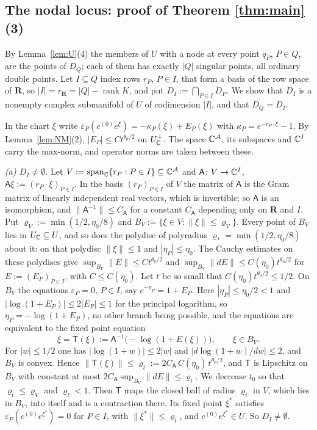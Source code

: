 \subsection{The nodal locus: proof of Theorem \texorpdfstring{\ref{thm:main}}{A}(3)}\label{ssec:nodal}

By Lemma~\ref{lem:U}(4) the members of $U$ with a node at every point $q_P$, $P\in Q$, are the points of $D_Q$; each of
them has exactly $|Q|$ singular points, all ordinary double points. Let $I\subseteq Q$ index rows $r_P$, $P\in I$, that
form a basis of the row space of $\mathbf R$, so $|I|=r_{\mathbf R}=|Q|-\operatorname{rank}K$, and put $D_I:=\bigcap_{P\in I}D_P$. We
show that $D_I$ is a nonempty complex submanifold of $U$ of codimension $|I|$, and that $D_Q=D_I$.

In the chart $\xi$ write $\varepsilon_P(c^{(0)}e^\xi)=-\kappa_P(\xi)+E_P(\xi)$ with $\kappa_P=e^{-r_P\cdot\xi}-1$. By
Lemma~\ref{lem:NM}(2), $|E_P|\le Ct^{\theta_0/2}$ on $U^+_\mathbb C$. The space $\mathbb C^{\mathcal A}$, its subspaces and $\mathbb C^I$ carry
the max-norm, and operator norms are taken between these.

\emph{(a) $D_I\neq\emptyset$.} Let $V:=\operatorname{span}_\mathbb C\{r_P:P\in I\}\subseteq\mathbb C^{\mathcal A}$ and
${\mathsf A}\colon V\to\mathbb C^I$, ${\mathsf A}\xi:=(r_P\cdot\xi)_{P\in I}$. In the basis $(r_P)_{P\in I}$ of $V$ the matrix of ${\mathsf A}$ is the Gram
matrix of linearly independent real vectors, which is invertible; so ${\mathsf A}$ is an isomorphism, and $\|{\mathsf A}^{-1}\|\le C_{\mathsf A}$ for
a constant $C_{\mathsf A}$ depending only on $\mathbf R$ and $I$. Put $\varrho_V:=\min(1/2,\eta_0/8)$ and
$B_V:=\{\xi\in V:\|\xi\|\le\varrho_V\}$. Every point of $B_V$ lies in $U_\mathbb C\subseteq U$, and so does the polydisc of
polyradius $\varrho_*=\min(1/2,\eta_0/8)$ about it: on that polydisc $\|\xi\|\le1$ and $|\eta_P|\le\eta_0$. The Cauchy
estimates on these polydiscs give $\sup_{B_V}\|E\|\le Ct^{\theta_0/2}$ and $\sup_{B_V}\|dE\|\le C(\eta_0)t^{\theta_0/2}$
for $E:=(E_P)_{P\in I}$, with $C\le C(\eta_0)$. Let $t$ be so small that $C(\eta_0)t^{\theta_0/2}\le1/2$. On $B_V$ the
equations $\varepsilon_P=0$, $P\in I$, say $e^{-\eta_P}=1+E_P$. Here $|\eta_P|\le\eta_0/2<1$ and $|\log(1+E_P)|\le2|E_P|\le1$
for the principal logarithm, so $\eta_P=-\log(1+E_P)$, no other branch being possible, and the equations are equivalent
to the fixed point equation
\[
\xi=\mathsf T(\xi):={\mathsf A}^{-1}\bigl(-\log(1+E(\xi))\bigr),\qquad\xi\in B_V .
\]
For $|w|\le1/2$ one has $|\log(1+w)|\le2|w|$ and $|d\log(1+w)/dw|\le2$, and $B_V$ is convex. Hence
$\|\mathsf T(\xi)\|\le\varrho_t:=2C_{\mathsf A}\,C(\eta_0)\,t^{\theta_0/2}$, and $\mathsf T$ is Lipschitz on $B_V$ with constant at most
$2C_{\mathsf A}\sup_{B_V}\|dE\|\le\varrho_t$. We decrease $t_0$ so that $\varrho_t\le\varrho_V$ and $\varrho_t<1$. Then $\mathsf T$
maps the closed ball of radius $\varrho_t$ in $V$, which lies in $B_V$, into itself and is a contraction there. Its
fixed point $\xi^*$ satisfies $\varepsilon_P(c^{(0)}e^{\xi^*})=0$ for $P\in I$, with $\|\xi^*\|\le\varrho_t$, and
$c^{(0)}e^{\xi^*}\in U$. So $D_I\neq\emptyset$.

